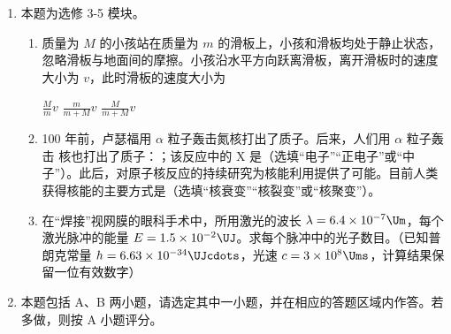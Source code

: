 \documentclass[\gkver]{gaokaozhenti}
\begin{document}
\begin{enumerate}
\item
本题为选修 3-5 模块。
\begin{enumerate}
	\item
	质量为 $M$ 的小孩站在质量为 $m$ 的滑板上，小孩和滑板均处于静止状态，忽略滑板与地面间的摩擦。小孩沿水平方向跃离滑板，离开滑板时的速度大小为 $v$，此时滑板的速度大小为
	
	{$\frac{M}{m}v$}
	{$\frac{m}{m+M}v$}
	{$\frac{M}{m+M}v$}
	\item
	100 年前，卢瑟福用 $\alpha$ 粒子轰击氮核打出了质子。后来，人们用 $\alpha$ 粒子轰击  核也打出了质子：；该反应中的 X 是\tkanswer{}（选填“电子”“正电子”或“中子”）。此后，对原子核反应的持续研究为核能利用提供了可能。目前人类获得核能的主要方式是\tkanswer{}（选填“核衰变”“核裂变”或“核聚变”）。
	\item
	在“焊接”视网膜的眼科手术中，所用激光的波长 $\lambda = 6.4\times10^{-7}\Um$，每个激光脉冲的能量 $E = 1.5\times10^{-2}\UJ$。求每个脉冲中的光子数目。（已知普朗克常量 $h = 6.63\times10^{-34}\UJcdots$，光速 $c = 3\times10^{8}\Ums$，计算结果保留一位有效数字）
\end{enumerate}

\item
本题包括 A、B 两小题，请选定其中一小题，并在相应的答题区域内作答。若多做，则按 A 小题评分。


\end{enumerate}
\end{document}
